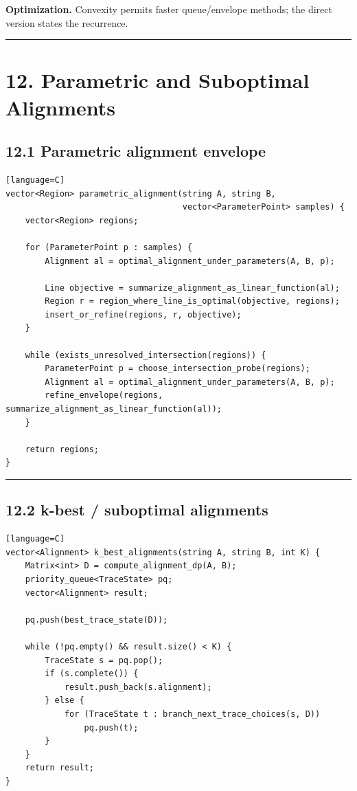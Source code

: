 \documentclass[11pt]{article}
\begin{document}
\textbf{Optimization.} Convexity permits faster queue/envelope methods; the direct version states the recurrence.

\begin{center}\rule{0.5\linewidth}{0.5pt}\end{center}

\section{12. Parametric and Suboptimal Alignments}\label{parametric-and-suboptimal-alignments}

\subsection{12.1 Parametric alignment envelope}\label{parametric-alignment-envelope}

\begin{verbatim}[language=C]
vector<Region> parametric_alignment(string A, string B,
                                    vector<ParameterPoint> samples) {
    vector<Region> regions;

    for (ParameterPoint p : samples) {
        Alignment al = optimal_alignment_under_parameters(A, B, p);

        Line objective = summarize_alignment_as_linear_function(al);
        Region r = region_where_line_is_optimal(objective, regions);
        insert_or_refine(regions, r, objective);
    }

    while (exists_unresolved_intersection(regions)) {
        ParameterPoint p = choose_intersection_probe(regions);
        Alignment al = optimal_alignment_under_parameters(A, B, p);
        refine_envelope(regions, summarize_alignment_as_linear_function(al));
    }

    return regions;
}
\end{verbatim}

\begin{center}\rule{0.5\linewidth}{0.5pt}\end{center}

\subsection{12.2 k-best / suboptimal alignments}\label{k-best-suboptimal-alignments}

\begin{verbatim}[language=C]
vector<Alignment> k_best_alignments(string A, string B, int K) {
    Matrix<int> D = compute_alignment_dp(A, B);
    priority_queue<TraceState> pq;
    vector<Alignment> result;

    pq.push(best_trace_state(D));

    while (!pq.empty() && result.size() < K) {
        TraceState s = pq.pop();
        if (s.complete()) {
            result.push_back(s.alignment);
        } else {
            for (TraceState t : branch_next_trace_choices(s, D))
                pq.push(t);
        }
    }
    return result;
}
\end{verbatim}
\end{document}
